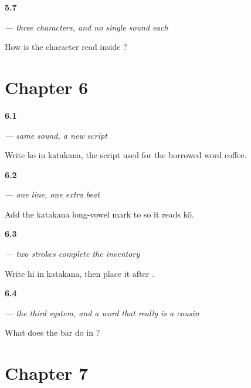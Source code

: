\noindent\begin{minipage}[t]{\linewidth}
\raggedright
\hypertarget{review-JA-C01-nihongo-readings}{\textbf{5.7}} \emph{ — three characters, and no single sound each}\par
\small How is the character  read inside ?
\end{minipage}\par\medskip

\section*{Chapter 6}

\noindent\begin{minipage}[t]{\linewidth}
\raggedright
\hypertarget{review-JA-W06-ko-katakana-ko}{\textbf{6.1}} \emph{ — same sound, a new script}\par
\small Write ko in katakana, the script used for the borrowed word coffee.
\end{minipage}\par\medskip

\noindent\begin{minipage}[t]{\linewidth}
\raggedright
\hypertarget{review-JA-W06-long-mark-beat}{\textbf{6.2}} \emph{ — one line, one extra beat}\par
\small Add the katakana long-vowel mark to  so it reads kō.
\end{minipage}\par\medskip

\noindent\begin{minipage}[t]{\linewidth}
\raggedright
\hypertarget{review-JA-W06-hi-katakana-two-strokes}{\textbf{6.3}} \emph{ — two strokes complete the inventory}\par
\small Write hi in katakana, then place it after .
\end{minipage}\par\medskip

\noindent\begin{minipage}[t]{\linewidth}
\raggedright
\hypertarget{review-JA-C01-koohii-bar}{\textbf{6.4}} \emph{ — the third system, and a word that really is a cousin}\par
\small What does the bar  do in ?
\end{minipage}\par\medskip

\section*{Chapter 7}

